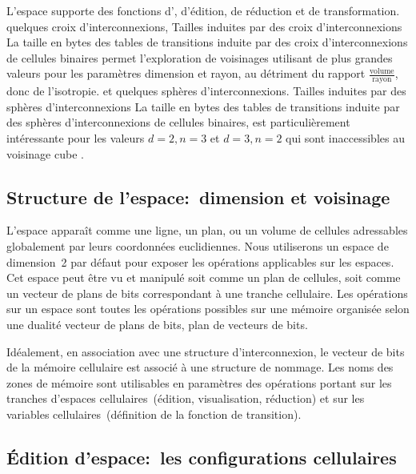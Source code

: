 \noindent L'espace supporte des fonctions d',
d'édition, de réduction et de transformation.
%
{quelques croix d'interconnexions,}%
{Tailles induites par des croix d'interconnexions}%
{La taille en bytes des tables de transitions induite par des croix
  d'interconnexions de cellules binaires permet l'exploration de
  voisinages utilisant de plus grandes valeurs pour les paramètres
  dimension et rayon, au détriment du rapport
  $\frac{\text{volume}}{\text{rayon}}$, donc de l'isotropie.}
%
{et quelques sphères d'interconnexions.}%
{Tailles induites par des sphères d'interconnexions}%
{La taille en bytes des tables de transitions induite par des sphères
  d'interconnexions de cellules binaires, est particulièrement
  intéressante pour les valeurs $d=2, n=3$ et $d=3, n=2$ qui sont
  inaccessibles au voisinage cube .}

\subsection{Structure de l'espace:~dimension et voisinage}

L'espace apparaît comme une ligne, un plan, ou un volume de cellules
adres\-sables globalement par leurs coordonnées euclidiennes. %
Nous utiliserons un espace de dimension~2 par défaut pour exposer les
opérations applicables sur les espaces. %
Cet espace peut être vu et manipulé soit comme un plan de cellules,
soit comme un vecteur de plans de bits correspondant à une tranche
cellulaire. %
Les opérations sur un espace sont toutes les opérations possibles sur
une mémoire organisée selon une dualité vecteur de plans de bits, plan
de vecteurs de bits.

Idéalement, en association avec une structure d'interconnexion, le
vecteur de bits de la mémoire cellulaire est associé à une structure
de nommage. %
Les noms des zones de mémoire sont utilisables en paramètres des
opérations portant sur les tranches d'espaces cellulaires~(édition,
visualisation, réduction) et sur les variables cellulaires~(définition
de la fonction de transition).

\subsection{Édition d'espace:~les configurations cellulaires}

